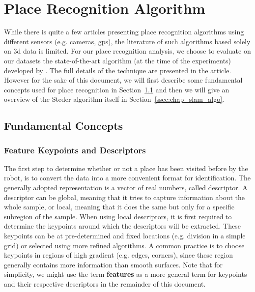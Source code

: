 \section{Place Recognition Algorithm}
\label{sec:chap_slam_algo}

While there is quite a few articles presenting place recognition algorithms using different sensors (e.g. cameras, \gls*{gps}), the literature of such algorithms based solely on \gls*{3d} data is limited. For our place recognition analysis, we choose to evaluate on our datasets the state-of-the-art algorithm (at the time of the experiments) developed by \citet{Steder2011b}. The full details of the technique are presented in the article. However for the sake of this document, we will first describe some fundamental concepts used for place recognition in Section~\ref{ssec:chap_slam_basics} and then we will give an overview of the Steder algorithm itself in Section~\ref{ssec:chap_slam_algo}. 


\subsection{Fundamental Concepts}
\label{ssec:chap_slam_basics}

\subsubsection{Feature Keypoints and Descriptors}
\label{ssub:feature_keypoints_and_descriptors}

The first step to determine whether or not a place has been visited before by the robot, is to convert the data into a more convenient format for identification. The generally adopted representation is a vector of real numbers, called descriptor. A descriptor can be global, meaning that it tries to capture information about the whole sample, or local, meaning that it does the same but only for a specific subregion of the sample. When using local descriptors, it is first required to determine the keypoints around which the descriptors will be extracted. These keypoints can be at pre-determined and fixed locations (e.g. division in a simple grid) or selected using more refined algorithms. A common practice is to choose keypoints in regions of high gradient (e.g. edges, corners), since these region generally contains more information than smooth surfaces. Note that for simplicity, we might use the term \textbf{features} as a more general term for keypoints and their respective descriptors in the remainder of this document.

